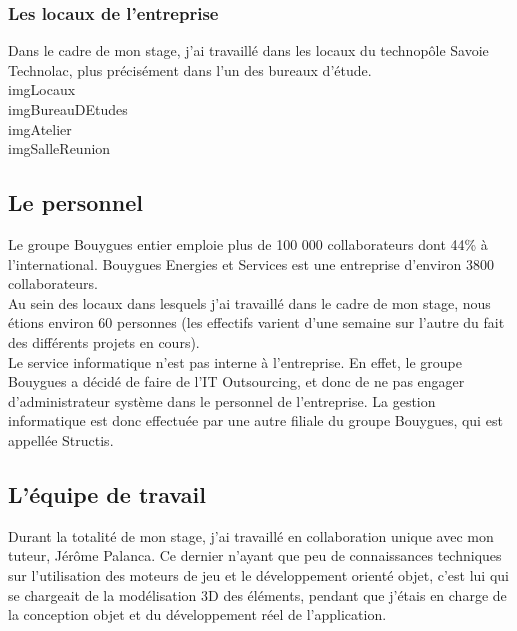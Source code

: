 \documentclass[a4paper]{article}
\begin{document}
    \subsubsection{Les locaux de l'entreprise}

    Dans le cadre de mon stage, j’ai travaillé dans les locaux du technopôle Savoie Technolac, plus précisément dans l'un des bureaux d’étude. \\

    imgLocaux \\
    imgBureauDEtudes \\
    imgAtelier \\
    imgSalleReunion \\

    \subsection{Le personnel}

    Le groupe Bouygues entier emploie plus de 100 000 collaborateurs dont 44\% à l’international. Bouygues Energies et Services est une entreprise d'environ 3800 collaborateurs. \\

    Au sein des locaux dans lesquels j'ai travaillé dans le cadre de mon stage, nous étions environ 60 personnes (les effectifs varient d'une semaine sur l'autre du fait des différents projets en cours).  \\

    Le service informatique n'est pas interne à l'entreprise. En effet, le groupe Bouygues a décidé de faire de l'IT Outsourcing, et donc de ne pas engager d'administrateur système dans le personnel de l'entreprise. La gestion informatique est donc effectuée par une autre filiale du groupe Bouygues, qui est appellée Structis. \\

    \subsection{L'équipe de travail}

    Durant la totalité de mon stage, j'ai travaillé en collaboration unique avec mon tuteur, Jérôme Palanca. Ce dernier n'ayant que peu de connaissances techniques sur l'utilisation des moteurs de jeu et le développement orienté objet, c'est lui qui se chargeait de la modélisation 3D des éléments, pendant que j'étais en charge de la conception objet et du développement réel de l'application. \\
    
\end{document}
